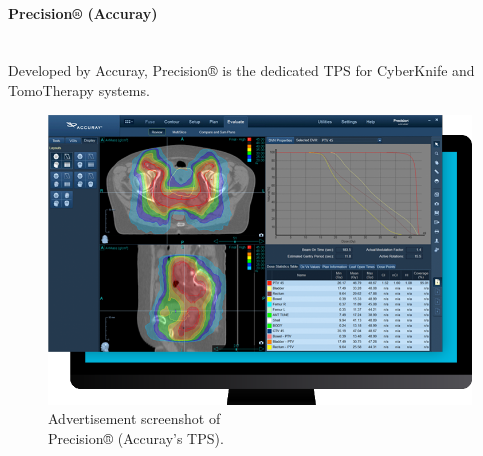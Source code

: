 \Needspace{5cm}
\begin{multicols}{2}
	\paragraph{Precision® (Accuray)}
	\ \\
	Developed by Accuray, Precision® \cite{precision} is the dedicated TPS for CyberKnife and TomoTherapy systems.
	
	\columnbreak
	
	\begin{figure}[H]
		\centering
		\captionsetup{width=\linewidth}
		\includegraphics[width=\linewidth]{PrecisionAccuray.png}
		\caption{Advertisement screenshot of \\ Precision® (Accuray's TPS).}
		\label{fig:screenshot_precision}
	\end{figure}
\end{multicols}

